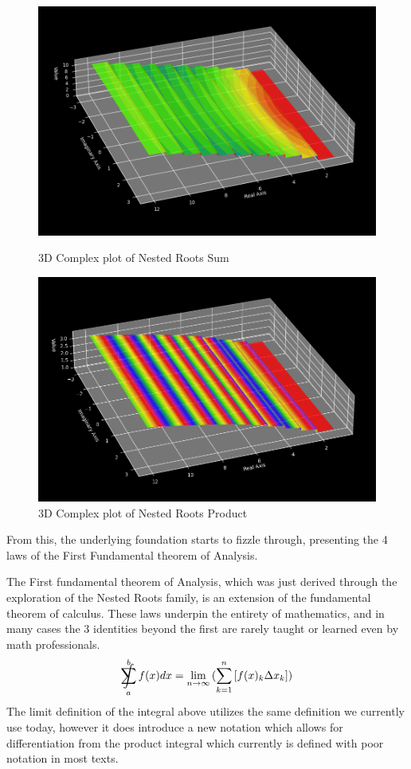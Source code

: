 \documentclass{article}
\DeclareMathOperator*{\SumInt}{%
\mathchoice%
  {\ooalign{$\displaystyle\sum$\cr\hidewidth$\displaystyle\int$\hidewidth\cr}}
  {\ooalign{\raisebox{.14\height}{\scalebox{.7}{$\textstyle\sum$}}\cr\hidewidth$\textstyle\int$\hidewidth\cr}}
  {\ooalign{\raisebox{.2\height}{\scalebox{.6}{$\scriptstyle\sum$}}\cr$\scriptstyle\int$\cr}}
  {\ooalign{\raisebox{.2\height}{\scalebox{.6}{$\scriptstyle\sum$}}\cr$\scriptstyle\int$\cr}}
}
\begin{document}
\begin{figure}[ht]
\begin{minipage}[b]{0.45\textwidth}
\includegraphics[scale=0.30]{graphs/3D_Complex_Graphs/NestedRoots/Roots_sum}
\caption{3D Complex plot of Nested Roots Sum}
\end{minipage}
\hfill
\begin{minipage}[b]{0.45\textwidth}
\includegraphics[scale=0.30]{graphs/3D_Complex_Graphs/NestedRoots/Roots_prod}
\caption{3D Complex plot of Nested Roots Product}
\end{minipage}
\end{figure}
From this, the underlying foundation starts to fizzle through, presenting the 4 laws of the First Fundamental theorem of Analysis.

\newpage
The First fundamental theorem of Analysis, which was just derived through the exploration of the Nested Roots family, is an extension of the fundamental theorem of calculus. These laws underpin the entirety of mathematics, and in many cases the 3 identities beyond the first are rarely taught or learned even by math professionals.
\begin{align*}
\SumInt_{a}^{b} f(x) dx = \lim_{n \to \infty}{(\sum_{k=1}^{n} \left[f(x)_{k}\Delta x_{k} \right])}
\end{align*}
The limit definition of the integral above utilizes the same definition we currently use today, however it does introduce a new notation which allows for differentiation from the product integral which currently is defined with poor notation in most texts.
\end{document}
